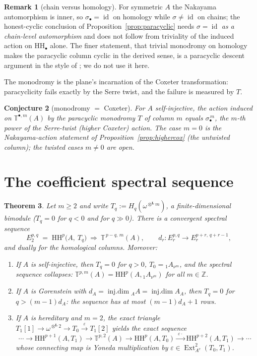 \documentclass[11pt]{amsart}
\newtheorem{theorem}{Theorem}[section]
\newtheorem{conjecture}[theorem]{Conjecture}
\theoremstyle{definition}
\newtheorem{remark}[theorem]{Remark}
\newcommand{\T}{\mathbb{T}}
\newcommand{\HH}{\mathrm{HH}}
\newcommand{\Ext}{\operatorname{Ext}}
\newcommand{\id}{\operatorname{id}}
\newcommand{\Ae}{A^{\mathrm{e}}}
\newcommand{\Lotimes}{\otimes^{\mathbf{L}}}
\begin{document}
\begin{remark}[chain versus homology]\label{rem:para-homology}
For symmetric $A$ the Nakayama automorphism is inner, so $\sigma_\bullet=\id$
on homology while $\sigma\ne\id$ on chains; the honest-cyclic conclusion of
Proposition~\ref{prop:paracyclic} needs $\sigma=\id$ \emph{as a chain-level
automorphism} and does not follow from triviality of the induced action on
$\HH_\bullet$ alone. The finer statement, that trivial monodromy on homology
makes the paracyclic column cyclic in the derived sense, is a paracyclic
descent argument in the style of \cite{GetzlerJones}; we do not use it here.
\end{remark}

The monodromy is the plane's incarnation of the Coxeter transformation:
paracyclicity fails exactly by the Serre twist, and the failure is measured by
$T$.

\begin{conjecture}[monodromy $=$ Coxeter]\label{conj:monodromy}
For $A$ self-injective, the action induced on $\T^{\bullet,m}(A)$ by the
paracyclic monodromy $T$ of column $m$ equals $\sigma_\bullet^{\,m}$, the
$m$-th power of the Serre-twist (higher Coxeter) action. The case $m=0$ is the
Nakayama-action statement of Proposition~\ref{prop:highercox} (the untwisted
column); the twisted cases $m\ne0$ are open.
\end{conjecture}

\section{The coefficient spectral sequence}\label{sec:ss}

\begin{theorem}\label{thm:ss}
Let $m\ge2$ and write $T_q:=H_q(\omega^{\Lotimes m})$, a finite-dimensional
bimodule ($T_q=0$ for $q<0$ and for $q\gg0$). There is a convergent spectral
sequence
\[
E_2^{p,q}\;=\;\HH^p\bigl(A,\ T_q\bigr)\ \Longrightarrow\ \T^{\,p-q,\,m}(A),
\qquad d_r\colon E_r^{p,q}\to E_r^{p+r,\,q+r-1},
\]
and dually for the homological columns. Moreover:
\begin{enumerate}
\item If $A$ is self-injective, then $T_q=0$ for $q>0$,
$T_0={}_1A_{\nu^m}$, and the spectral sequence collapses:
$\T^{p,m}(A)=\HH^p(A,{}_1A_{\nu^m})$ for all $m\in\mathbb Z$.
\item If $A$ is Gorenstein with
$d_A=\operatorname{inj.dim}{}_AA=\operatorname{inj.dim}A_A$, then $T_q=0$ for
$q>(m-1)d_A$: the sequence has at most $(m-1)d_A+1$ rows.
\item If $A$ is hereditary and $m=2$, the exact triangle
$T_1[1]\to\omega^{\Lotimes2}\to T_0\xrightarrow{\ \varepsilon\ }T_1[2]$
yields the exact sequence
\[
\cdots\to\HH^{p+1}(A,T_1)\to\T^{p,2}(A)\to\HH^{p}(A,T_0)
\xrightarrow{\ \varepsilon\cdot\ }\HH^{p+2}(A,T_1)\to\cdots
\]
whose connecting map is Yoneda multiplication by
$\varepsilon\in\Ext^2_{\Ae}(T_0,T_1)$.
\end{enumerate}
\end{theorem}
\end{document}
